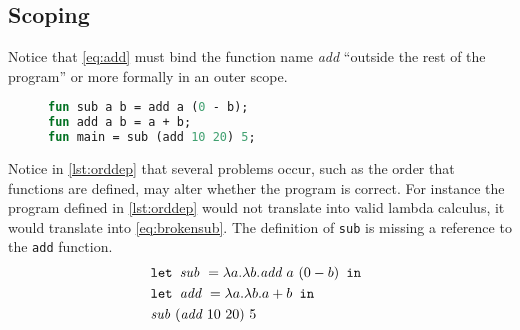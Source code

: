 \subsection{Scoping}\label{scoping}
Notice that \autoref{eq:add} must bind the function name \textit{add} ``outside the rest of the program'' or more formally in an outer scope.
\begin{figure}
\begin{lstlisting}[language=ML,caption={An order dependent program},label={lst:orddep}]
fun sub a b = add a (0 - b);
fun add a b = a + b;
fun main = sub (add 10 20) 5;
\end{lstlisting}
\end{figure}
Notice in \autoref{lst:orddep} that several problems occur, such as the order that functions are defined, may alter whether the program is correct.
For instance the program defined in \autoref{lst:orddep} would not translate into valid lambda calculus, it would translate into \autoref{eq:brokensub}.
The definition of \texttt{sub} is missing a reference to the \texttt{add} function.
\begin{align}
  &\texttt{let } \textit{sub } = \lambda a.\lambda b.\textit{add } a \,\,(0 - b) \texttt{ in } \label{eq:brokensub}\\&\texttt{let } \textit{add } = \lambda a.\lambda b.a+b \texttt{ in } \tag*{}\\&\textit{sub } (\textit{add } 10 \,\, 20) \,\, 5\tag*{}
\end{align}

